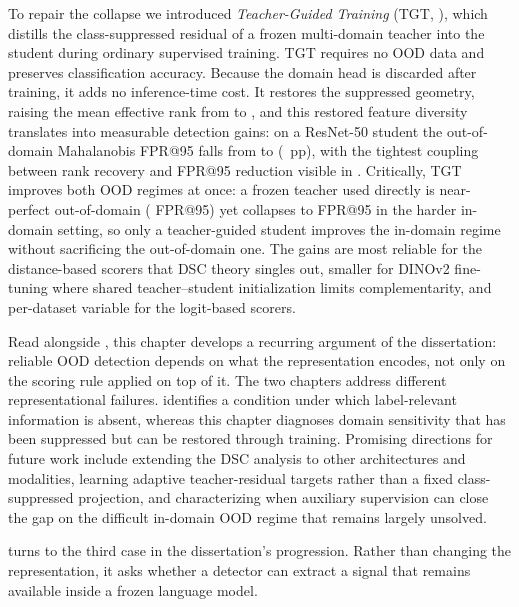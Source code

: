 To repair the collapse we introduced \emph{Teacher-Guided Training} (TGT, ), which distills the class-suppressed residual of a frozen multi-domain teacher into the student during ordinary supervised training. TGT requires no OOD data and preserves classification accuracy. Because the domain head is discarded after training, it adds no inference-time cost. It restores the suppressed geometry, raising the mean effective rank from  to , and this restored feature diversity translates into measurable detection gains: on a ResNet-50 student the out-of-domain Mahalanobis FPR@95 falls from  to  (~pp), with the tightest coupling between rank recovery and FPR@95 reduction visible in . Critically, TGT improves both OOD regimes at once: a frozen teacher used directly is near-perfect out-of-domain ( FPR@95) yet collapses to  FPR@95 in the harder in-domain setting, so only a teacher-guided student improves the in-domain regime without sacrificing the out-of-domain one. The gains are most reliable for the distance-based scorers that DSC theory singles out, smaller for DINOv2 fine-tuning where shared teacher--student initialization limits complementarity, and per-dataset variable for the logit-based scorers.

Read alongside , this chapter develops a recurring argument of the dissertation: reliable OOD detection depends on what the representation encodes, not only on the scoring rule applied on top of it. The two chapters address different representational failures.  identifies a condition under which label-relevant information is absent, whereas this chapter diagnoses domain sensitivity that has been suppressed but can be restored through training. Promising directions for future work include extending the DSC analysis to other architectures and modalities, learning adaptive teacher-residual targets rather than a fixed class-suppressed projection, and characterizing when auxiliary supervision can close the gap on the difficult in-domain OOD regime that remains largely unsolved.

 turns to the third case in the dissertation's
progression. Rather than changing the representation, it asks whether a detector
can extract a signal that remains available inside a frozen language model.

